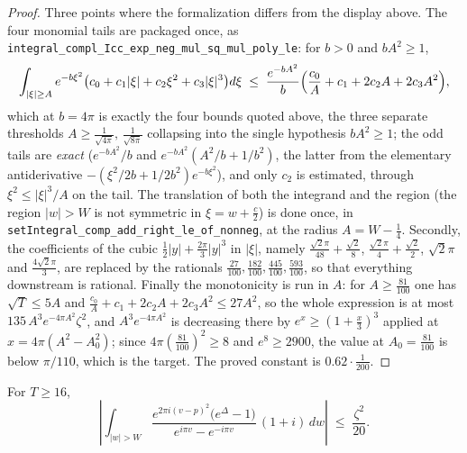 \begin{proof}
Three points where the formalization differs from the display above.  The
four monomial tails are packaged once, as
\texttt{integral\_compl\_Icc\_exp\_neg\_mul\_sq\_mul\_poly\_le}: for $b>0$ and $bA^{2}\ge1$,
\[
  \int_{\lvert\xi\rvert\ge A}e^{-b\xi^{2}}
     \bigl(c_{0}+c_{1}\lvert\xi\rvert+c_{2}\xi^{2}+c_{3}\lvert\xi\rvert^{3}\bigr)d\xi
  \;\le\;\frac{e^{-bA^{2}}}{b}
     \Bigl(\frac{c_{0}}A+c_{1}+2c_{2}A+2c_{3}A^{2}\Bigr),
\]
which at $b=4\pi$ is exactly the four bounds quoted above, the three separate thresholds
$A\ge\tfrac1{\sqrt{4\pi}},\,\tfrac1{\sqrt{8\pi}}$ collapsing into the single hypothesis
$bA^{2}\ge1$; the odd tails are \emph{exact} ($e^{-bA^{2}}/b$ and
$e^{-bA^{2}}(A^{2}/b+1/b^{2})$, the latter from the elementary antiderivative
$-(\xi^{2}/2b+1/2b^{2})e^{-b\xi^{2}}$), and only $c_{2}$ is estimated, through
$\xi^{2}\le\lvert\xi\rvert^{3}/A$ on the tail.  The translation of both the integrand and the
region (the region $\lvert w\rvert>W$ is not symmetric in $\xi=w+\tfrac c2$) is done once,
in \texttt{setIntegral\_comp\_add\_right\_le\_of\_nonneg}, at the radius $A=W-\tfrac14$.
Secondly, the coefficients of the cubic
$\tfrac12\lvert y\rvert+\tfrac{2\pi}3\lvert y\rvert^{3}$ in $\lvert\xi\rvert$, namely
$\tfrac{\sqrt2\pi}{48}+\tfrac{\sqrt2}8$, $\tfrac{\sqrt2\pi}4+\tfrac{\sqrt2}2$, $\sqrt2\pi$ and
$\tfrac{4\sqrt2\pi}3$, are replaced by the rationals
$\tfrac{27}{100},\tfrac{182}{100},\tfrac{445}{100},\tfrac{593}{100}$, so that everything
downstream is rational.  Finally the monotonicity is run in $A$: for
$A\ge\tfrac{81}{100}$ one has $\sqrt T\le5A$ and
$\tfrac{c_{0}}A+c_{1}+2c_{2}A+2c_{3}A^{2}\le27A^{2}$, so the whole expression is at most
$135\,A^{3}e^{-4\pi A^{2}}\zeta^{2}$, and $A^{3}e^{-4\pi A^{2}}$ is decreasing there by
$e^{x}\ge(1+\tfrac x3)^{3}$ applied at $x=4\pi(A^{2}-A_{0}^{2})$; since
$4\pi(\tfrac{81}{100})^{2}\ge8$ and $e^{8}\ge2900$, the value at $A_{0}=\tfrac{81}{100}$ is below
$\pi/110$, which is the target.  The proved constant is $0.62\cdot\tfrac1{200}$.
\end{proof}

\begin{lemma}
\label{lem:rsf_outer_sharp}
\leanok
{}
For $T\ge16$,
\[
  \left\lvert\int_{\lvert w\rvert>W}
    \frac{e^{2\pi i(v-p)^{2}}\bigl(e^{\Delta}-1\bigr)}{e^{i\pi v}-e^{-i\pi v}}\,(1+i)\,dw
  \right\rvert\;\le\;\frac{\zeta^{2}}{20}.
\]
\end{lemma}

